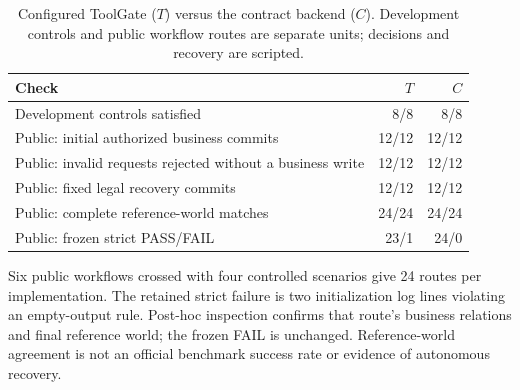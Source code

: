 
\begin{table}[tbp]
\caption{Configured ToolGate ($T$) versus the contract backend ($C$). Development controls and public workflow routes are separate units; decisions and recovery are scripted.}
\label{tab:external}
\centering\small
\begin{tabularx}{\textwidth}{@{}Xrr@{}}
\toprule
Check & $T$ & $C$ \\
\midrule
Development controls satisfied & 8/8 & 8/8 \\
Public: initial authorized business commits & 12/12 & 12/12 \\
Public: invalid requests rejected without a business write & 12/12 & 12/12 \\
Public: fixed legal recovery commits & 12/12 & 12/12 \\
Public: complete reference-world matches & 24/24 & 24/24 \\
Public: frozen strict PASS/FAIL & 23/1 & 24/0 \\
\bottomrule
\end{tabularx}
\par\smallskip
\begin{minipage}{\textwidth}\small
Six public workflows crossed with four controlled scenarios give 24 routes per implementation.
The retained strict failure is two initialization log lines violating an empty-output rule.
Post-hoc inspection confirms that route's business relations and final reference world;
the frozen FAIL is unchanged. Reference-world agreement is not an official benchmark
success rate or evidence of autonomous recovery.
\end{minipage}
\end{table}

